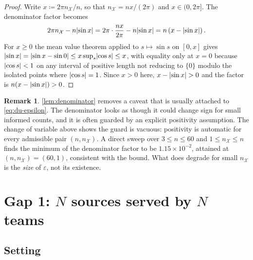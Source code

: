 \documentclass[11pt,a4paper]{article}
\theoremstyle{plain}
\theoremstyle{definition}
\newtheorem{remark}{Remark}
\DeclarePairedDelimiter{\abs}{\lvert}{\rvert}
\newcommand{\NotationContext}[1]{\markboth{#1}{#1}}
\begin{document}
\begin{proof}
Write $x\coloneqq2\pi n_{\mathcal X}/n$, so that $n_{\mathcal X}=nx/(2\pi)$ and $x\in(0,2\pi]$.
The denominator factor becomes
\begin{equation*}
    2\pi n_{\mathcal X}-n\abs{\sin x}
    =2\pi\cdot\frac{nx}{2\pi}-n\abs{\sin x}
    =n\left(x-\abs{\sin x}\right).
\end{equation*}
For $x\geq0$ the mean value theorem applied to $s\mapsto\sin s$ on $[0,x]$ gives
$\abs{\sin x}=\abs{\sin x-\sin0}\leq x\sup_{s}\abs{\cos s}\leq x$, with equality only at $x=0$
because $\abs{\cos s}<1$ on any interval of positive length not reducing to $\{0\}$ modulo the
isolated points where $\abs{\cos s}=1$. Since $x>0$ here, $x-\abs{\sin x}>0$ and the factor is
$n(x-\abs{\sin x})>0$.
\end{proof}

\begin{remark}\label{rem:denominator-caveat}
\cref{lem:denominator} removes a caveat that is usually attached to \eqref{eq:du-epsilon}.
The denominator looks as though it could change sign for small informed counts, and it is often
guarded by an explicit positivity assumption. The change of variable above shows the guard is
vacuous: positivity is automatic for every admissible pair $(n,n_{\mathcal X})$. A direct sweep
over $3\leq n\leq60$ and $1\leq n_{\mathcal X}\leq n$ finds the minimum of the denominator factor
to be $1.15\times10^{-2}$, attained at $(n,n_{\mathcal X})=(60,1)$, consistent with the bound.
What does degrade for small $n_{\mathcal X}$ is the \emph{size} of $\varepsilon$, not its
existence.
\end{remark}

\section{Gap 1: $N$ sources served by $N$ teams}\label{sec:gap1}
\NotationContext{teams}

\subsection{Setting}\label{sec:gap1-setting}
\end{document}
